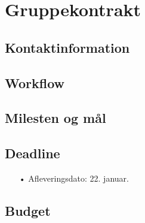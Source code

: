 \section{Gruppekontrakt}
\subsection{Kontaktinformation}

\subsection{Workflow}

\subsection{Milesten og mål}

\subsection{Deadline}
\begin{enumerate}
	\item[•]Afleveringsdato: 22. januar.
\end{enumerate}

\subsection{Budget}
